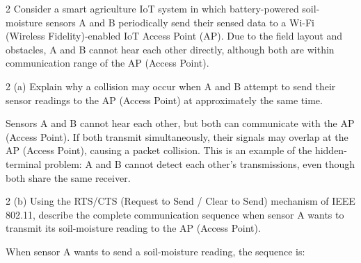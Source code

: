 
\begin{question}{2}
Consider a smart agriculture IoT system in which battery-powered soil-moisture sensors A and B
periodically send their sensed data to a Wi-Fi (Wireless Fidelity)-enabled IoT Access Point (AP).
Due to the field layout and obstacles, A and B cannot hear each other directly, although both are within
communication range of the AP (Access Point).
\end{question}

\begin{question}{2 (a)}
Explain why a collision may occur when A and B attempt to send their sensor readings to the AP (Access Point) at
approximately the same time.
\end{question}

Sensors A and B cannot hear each other, but both can communicate with the AP (Access Point). If both transmit
simultaneously, their signals may overlap at the AP (Access Point), causing a packet collision. This is an example of
the hidden-terminal problem: A and B cannot detect each other's transmissions, even though both share the same
receiver.


\newpage
\begin{question}{2 (b)}
Using the RTS/CTS (Request to Send / Clear to Send) mechanism of IEEE 802.11, describe the complete communication sequence when sensor A wants to transmit its soil-moisture
reading to the AP (Access Point).
\end{question}

When sensor A wants to send a soil-moisture reading, the sequence is:

